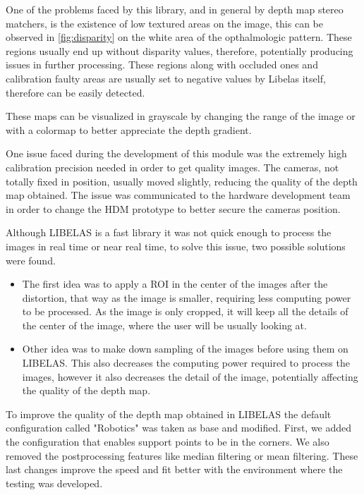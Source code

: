 \documentclass[10pt,a4paper,twocolumn,twoside]{article}
\begin{document}
	 One of the problems faced by this library, and in general by depth map stereo matchers, is the existence of low textured areas on the image, this can be observed in \ref{fig:disparity} on the white area of the opthalmologic pattern. These regions usually end up without disparity values, therefore, potentially producing issues in further processing. These regions along with occluded ones and calibration faulty areas are usually set to negative values by Libelas itself, therefore can be easily detected.  
	 
	 These maps can be visualized in grayscale by changing the range of the image or with a colormap to better appreciate the depth gradient. 
	 
	 One issue faced during the development of this module was the extremely high calibration precision needed in order to get quality images. The cameras, not totally fixed in position, usually moved slightly, reducing the quality of the depth map obtained. The issue was communicated to the hardware development team in order to change the HDM prototype to better secure the cameras position.  
	 
	 Although LIBELAS is a fast library it was not quick enough to process the images in real time or near real time, to solve this issue, two possible solutions were found. 
	 
	 \begin{itemize}
	 	\item The first idea was to apply a ROI in the center of the images after the distortion, that way as the image is smaller, requiring less computing power to be processed. As the image is only cropped, it will keep all the details of the center of the image, where the user will be usually looking at.  
	 	 
	 	\item Other idea was to make down sampling of the images before using them on LIBELAS. This also decreases the computing power required to process the images, however it also decreases the detail of the image, potentially affecting the quality of the depth map.  
 	 \end{itemize}
	 
	 To improve the quality of the depth map obtained in LIBELAS the default configuration called "Robotics" was taken as base and modified. First, we added the configuration that enables support points to be in the corners. We also removed the postprocessing features like median filtering or mean filtering. These last changes improve the speed and fit better with the environment where the testing was developed.
	 
\end{document}
